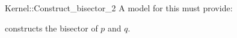 \begin{ccRefFunctionObjectConcept}{Kernel::Construct_bisector_2}
A model for this must provide:


{constructs the bisector of $p$ and $q$.}

\ccIsModel{}

\end{ccRefFunctionObjectConcept}
